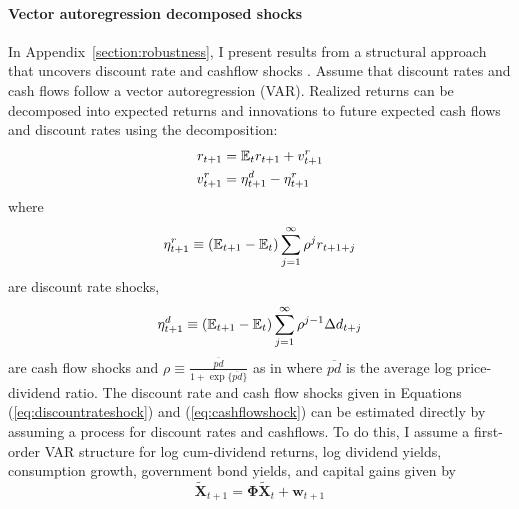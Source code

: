 \paragraph{Vector autoregression decomposed shocks}
In Appendix~\ref{section:robustness}, I present results from a structural approach that uncovers discount rate and cashflow shocks \citep{Campbell1991}. Assume that discount rates and cash flows follow a vector autoregression (VAR). Realized returns can be decomposed into expected returns and innovations to future expected cash flows and discount rates using the decomposition:
\begin{align}
r_{t+1}   & = \mathbb{E}_{t} r_{t+1}+v^{r}_{t+1}\label{eq:fulldecomp} \\
v^{r}_{t+1} &= \eta^{d}_{t+1} -\eta^{r}_{t+1}\label{eq:errordecomp}
\end{align}
where
\begin{equation}
\eta^{r}_{t+1} \equiv\left(\mathbb{E}_{t+1}-\mathbb{E}_{t}\right) \sum_{j=1}^{\infty} \rho^{j} r_{t+1+j}\label{eq:discountrateshock}
\end{equation}
are discount rate shocks,
\begin{equation}
\eta^{d}_{t+1} \equiv\left(\mathbb{E}_{t+1}-\mathbb{E}_{t}\right) \sum_{j=1}^{\infty} \rho^{j-1} \Delta d_{t+j}\label{eq:cashflowshock}
\end{equation}
are cash flow shocks and $\rho \equiv \frac{\overline{pd}}{1+\exp\{\overline{pd}\}}$ as in \cite{Campbell1988} where $\overline{pd}$ is the average log price-dividend ratio.  The discount rate and cash flow shocks given in Equations (\ref{eq:discountrateshock}) and (\ref{eq:cashflowshock}) can be estimated directly by assuming a process for discount rates and cashflows. To do this, I assume a first-order VAR structure for log cum-dividend returns, log dividend yields, consumption growth, government bond yields, and capital gains given by 
\begin{equation}
\tilde{\mathbf{X}}_{t+1}=\mathbf{\Phi}\tilde{\mathbf{X}}_{t}+\mathbf{w}_{t+1}\label{eq:VARsetup}
\end{equation}
